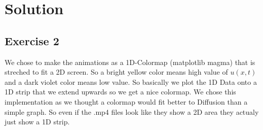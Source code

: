 
\section{Solution}
\label{sec:auswertung}


\subsection{Exercise 2}

We chose to make the animations as a 1D-Colormap (matplotlib magma) that is streched to fit a 2D screen.
So a bright yellow color means high value of $u(x,t)$ and a dark violet color means low value.
So basically we plot the 1D Data onto a 1D strip that we extend upwards so we get a nice colormap.
We chose this implementation as we thought a colormap would fit better to Diffusion than a simple graph.
So even if the .mp4 files look like they show a 2D area they actualy just show a 1D strip.

